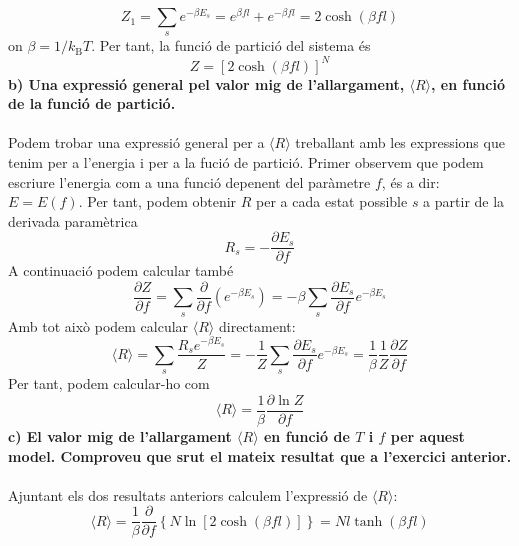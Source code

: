 \documentclass[12pt,twosides,onecolumn,openany]{article}
\begin{document}
\begin{equation*}
    Z_1 = \sum_{s} e^{-\beta E_s} = e^{\beta fl} + e^{-\beta fl} = 2 \cosh{(\beta fl)}
\end{equation*}
on $\beta = 1/k_{\text{B}}T$. Per tant, la funció de partició del sistema és
\begin{equation*}
    \boxed{
    Z = [2\cosh{(\beta fl)}]^{N}
    }
\end{equation*}
\textbf{b) Una expressió general pel valor mig de l'allargament, $\langle R \rangle$, en funció de la funció de partició.}\\\\
Podem trobar una expressió general per a $\langle R \rangle$ treballant amb les expressions que tenim per a l'energia i per a la fució de partició. Primer observem que podem escriure l'energia com a una funció depenent del paràmetre $f$, és a dir: $E = E(f)$. Per tant, podem obtenir $R$ per a cada estat possible $s$ a partir de la derivada paramètrica
\begin{equation*}
    R_s = -\frac{\partial E_s}{\partial f}
\end{equation*}
A continuació podem calcular també
\begin{equation*}
    \frac{\partial Z}{\partial f} = \sum_{s}\frac{\partial}{\partial f}\left(e^{-\beta E_s}\right) = - \beta \sum_{s}\frac{\partial E_s}{\partial f}e^{-\beta E_s}
\end{equation*}
Amb tot això podem calcular $\langle R \rangle$ directament:
\begin{equation*}
    \langle R \rangle = \sum_{s} \frac{R_se^{-\beta E_s}}{Z} = -\frac{1}{Z}\sum_{s}\frac{\partial E_s}{\partial f}e^{-\beta E_s} = \frac{1}{\beta}\frac{1}{Z}\frac{\partial Z}{\partial f}
\end{equation*}
Per tant, podem calcular-ho com 
\begin{equation*}
    \boxed{
        \langle R \rangle = \frac{1}{\beta} \frac{\partial \ln{Z}}{\partial f}
    }
\end{equation*}
\textbf{c) El valor mig de l'allargament $\langle R \rangle$ en funció de $T$ i $f$ per aquest model. Comproveu que srut el mateix resultat que a l'exercici anterior.}\\\\
Ajuntant els dos resultats anteriors calculem l'expressió de $\langle R \rangle$:
\begin{equation*}
    \langle R \rangle = \frac{1}{\beta} \frac{\partial}{\partial f}\left\{ N\ln{[2\cosh{(\beta f l)}]} \right\} = Nl \tanh{(\beta fl)}
\end{equation*}
\end{document}
